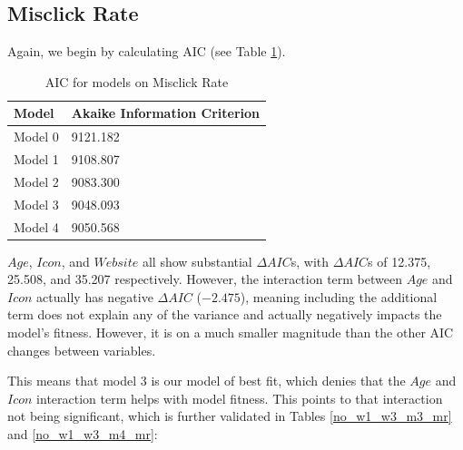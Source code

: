 \documentclass[12pt,twoside]{reedthesis}
\begin{document}
\subsection{Misclick Rate}\label{4.2.2}

    Again, we begin by calculating AIC (see Table \ref{aic_mr}).

    \begin{table}[H]
        \centering
        \begin{tabular}{| p{3.5cm} | p{7.5cm} |}
            \hline
            Model & Akaike Information Criterion\\
            \hline
            Model 0 & 9121.182\\
            \hline
            Model 1 & 9108.807\\
            \hline
            Model 2 & 9083.300\\
            \hline
            Model 3 & 9048.093\\
            \hline
            Model 4 & 9050.568\\
            \hline
        \end{tabular}
        \caption{AIC for models on Misclick Rate}
        \label{aic_mr}
    \end{table}

    $Age$, $Icon$, and $Website$ all show substantial $\Delta AIC$s, with $\Delta AIC$s of 12.375, 25.508, and 35.207 respectively. However, the interaction term between $Age$ and $Icon$ actually has negative $\Delta AIC$ ($-2.475$), meaning including the additional term does not explain any of the variance and actually negatively impacts the model's fitness. However, it is on a much smaller magnitude than the other AIC changes between variables.

    This means that model 3 is our model of best fit, which denies that the $Age$ and $Icon$ interaction term helps with model fitness. This points to that interaction not being significant, which is further validated in Tables \ref{no_w1_w3_m3_mr} and \ref{no_w1_w3_m4_mr}:
\end{document}
